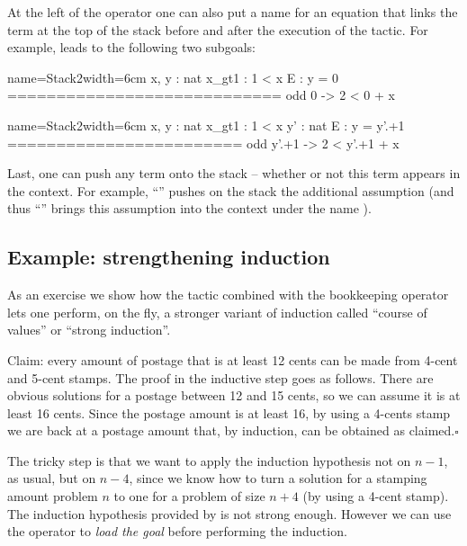 At the left of the \C{:} operator one can also put a name for an
equation that links the term at the top of the stack before and
after the execution of the tactic. For example,
  leads to
the following two subgoals:

\begin{coqout}{name=Stack2}{width=6cm}
 x, y : nat
 x_gt1 : 1 < x
 E : y = 0
============================
 odd 0 -> 2 < 0 + x
\end{coqout}
\begin{coqout}{name=Stack2}{width=6cm}
 x, y : nat
 x_gt1 : 1 < x
 y' : nat
 E : y = y'.+1
========================
 odd y'.+1 -> 2 < y'.+1 + x
\end{coqout}

Last, one can push any term onto the stack -- whether or not this
term appears in the context. For example,
``'' pushes on the stack
the additional assumption  (and thus
``'' brings this assumption into the context
under the name ).

\subsection{Example: strengthening induction}
\label{sec:strongind}

As an exercise we show how the  tactic combined with the bookkeeping
operator \C{:} lets one perform, on the fly, a stronger variant of
induction called ``course of values'' or ``strong induction''.

Claim: every amount of postage that is at least 12 cents
can be made from 4-cent and 5-cent stamps.  The proof in the inductive
step goes as follows.  There are obvious solutions for a postage between
12 and 15 cents, so we can assume it is at least 16 cents.  Since
the postage amount is at least 16, by using a 4-cents stamp we are back
at a postage amount that, by induction, can be obtained as claimed.\hfill$\square$

The tricky step is that we want to apply the induction hypothesis not
on $n-1$, as usual, but on $n-4$, since we know how to turn a
solution for a stamping amount problem $n$ to one for a problem of
size $n+4$ (by using a 4-cent stamp).
The induction hypothesis provided by 
is not strong enough.  However we can use the \C{:} operator
to \emph{load the goal} before performing the induction.


